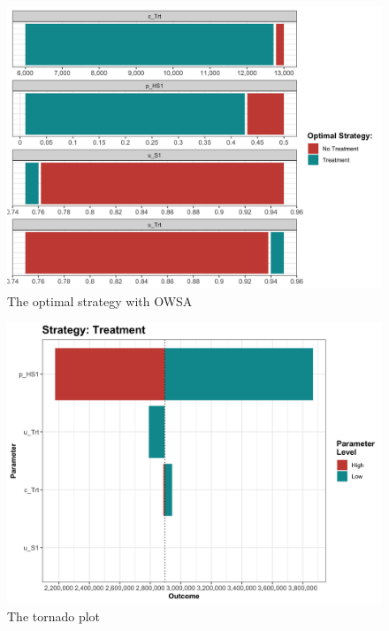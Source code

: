 \documentclass[]{book}
\begin{document}
\begin{figure}

{\centering \includegraphics[width=1\linewidth]{../figs/05a_optimal_owsa_nmb} 

}

\caption{The optimal strategy with OWSA}\label{fig:05a-optimal-owsa-nmb}
\end{figure}

\begin{figure}

{\centering \includegraphics[width=1\linewidth]{../figs/05a_tornado_Treatment_nmb} 

}

\caption{The tornado plot}\label{fig:05a-tornado-Treatment-nmb}
\end{figure}
\end{document}
